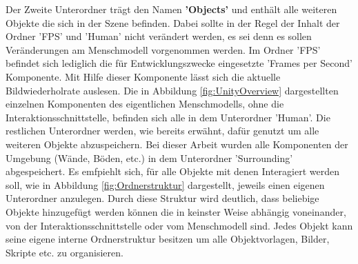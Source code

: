 Der Zweite Unterordner trägt den Namen \textbf{'Objects'} und enthält alle weiteren Objekte die sich in der Szene befinden. Dabei sollte in der Regel der Inhalt der Ordner 'FPS' und 'Human' nicht verändert werden, es sei denn es sollen Veränderungen am Menschmodell vorgenommen werden. Im Ordner 'FPS' befindet sich lediglich die für Entwicklungszwecke eingesetzte 'Frames per Second' Komponente. Mit Hilfe dieser Komponente lässt sich die aktuelle Bildwiederholrate auslesen. Die in Abbildung \ref{fig:UnityOverview} dargestellten einzelnen Komponenten des eigentlichen Menschmodells, ohne die Interaktionsschnittstelle, befinden sich alle in dem Unterordner 'Human'. Die restlichen Unterordner werden, wie bereits erwähnt, dafür genutzt um alle weiteren Objekte abzuspeichern. Bei dieser Arbeit wurden alle Komponenten der Umgebung (Wände, Böden, etc.) in dem Unterordner 'Surrounding' abgespeichert. Es emfpiehlt sich, für alle Objekte mit denen Interagiert werden soll, wie in Abbildung \ref{fig:Ordnerstruktur} dargestellt, jeweils einen eigenen Unterordner anzulegen. Durch diese Struktur wird deutlich, dass beliebige Objekte hinzugefügt werden können die in keinster Weise abhängig voneinander, von der Interaktionsschnittstelle oder vom Menschmodell sind. Jedes Objekt kann seine eigene interne Ordnerstruktur besitzen um alle Objektvorlagen, Bilder, Skripte etc. zu organisieren.

